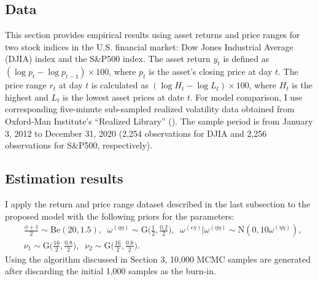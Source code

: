 \documentclass[11pt]{article}
\begin{document}
\subsection{Data}
This section provides empirical results using asset returns and price ranges for two stock indices in the U.S. financial market: 
Dow Jones Industrial Average (DJIA) index and the S\&P500 index. 
The asset return $y_t$ is defined as $(\log p_{t} -\log p_{t-1})\times 100$, where $p_t$ is the asset's closing price at day $t$. 
The price range $r_t$ at day $t$ is calculated as $(\log H_t -\log L_t)\times 100$,  where $H_t$ is the highest and $L_t$ is the lowest asset prices at date $t$. 
For model comparison, I use corresponding five-minute sub-sampled realized volatility data obtained from Oxford-Man Institute's ``Realized Library'' (\cite{Heber_etal(2009)}).
The sample period is from January 3, 2012 to December 31, 2020 (2,254 observations for DJIA and 2,256 observations for S\&P500, respectively). 

\subsection{Estimation results}
I apply the return and price range dataset described in the last subsection to the proposed model with the following priors for the parameters:  
\begin{align}
&\frac{\phi +1}{2} \sim\mathrm{Be}(20, 1.5), \;\;
\omega^{(\eta\eta)}\sim\mathrm{G}\bigg(\frac{1}{2}, \frac{0.2}{2}\bigg), \;\; 
\omega^{(\epsilon\eta)}|\omega^{(\eta\eta)}\sim\mathrm{N}(0, 10\omega^{(\eta\eta)}), \\
&\nu_1 \sim\mathrm{G}\bigg( \frac{16}{2}, \frac{0.8}{2} \bigg), \;\;
\nu_2 \sim\mathrm{G}\bigg( \frac{16}{2}, \frac{0.8}{2} \bigg). 
\end{align}
Using the algorithm discussed in Section 3, 10,000 MCMC samples are generated after discarding the initial 1,000 samples as the burn-in. 
\end{document}
